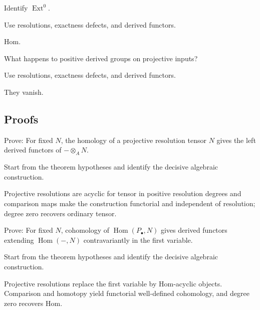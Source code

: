 \begin{exercise}\label{exr:v28-expand-04}
Identify $\operatorname{Ext}^0$.
\end{exercise}
\begin{hint}
Use resolutions, exactness defects, and derived functors.
\end{hint}
\begin{solution}
Hom.
\end{solution}

\begin{exercise}\label{exr:v28-expand-05}
What happens to positive derived groups on projective inputs?
\end{exercise}
\begin{hint}
Use resolutions, exactness defects, and derived functors.
\end{hint}
\begin{solution}
They vanish.
\end{solution}

\subsection*{Proofs}

\begin{exercise}\label{exr:v28-expand-06}
Prove: For fixed $N$, the homology of a projective resolution tensor $N$ gives the left derived functors of $-\otimes_A N$.
\end{exercise}
\begin{hint}
Start from the theorem hypotheses and identify the decisive algebraic construction.
\end{hint}
\begin{solution}
Projective resolutions are acyclic for tensor in positive resolution degrees and comparison maps make the construction functorial and independent of resolution; degree zero recovers ordinary tensor.
\end{solution}

\begin{exercise}\label{exr:v28-expand-07}
Prove: For fixed $N$, cohomology of $\operatorname{Hom}(P_\bullet,N)$ gives derived functors extending $\operatorname{Hom}(-,N)$ contravariantly in the first variable.
\end{exercise}
\begin{hint}
Start from the theorem hypotheses and identify the decisive algebraic construction.
\end{hint}
\begin{solution}
Projective resolutions replace the first variable by Hom-acyclic objects. Comparison and homotopy yield functorial well-defined cohomology, and degree zero recovers Hom.
\end{solution}

